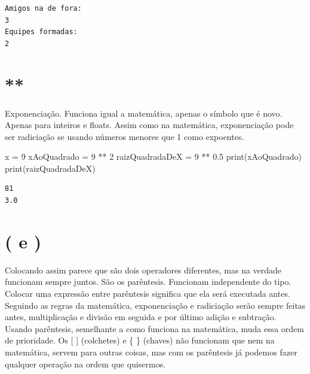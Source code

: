 \documentclass[
  letterpaper,
  DIV=11,
  numbers=noendperiod]{scrreprt}
\newenvironment{Shaded}{\begin{snugshade}}{\end{snugshade}}
\newcommand{\BuiltInTok}[1]{\textcolor[rgb]{0.00,0.23,0.31}{#1}}
\newcommand{\DecValTok}[1]{\textcolor[rgb]{0.68,0.00,0.00}{#1}}
\newcommand{\FloatTok}[1]{\textcolor[rgb]{0.68,0.00,0.00}{#1}}
\newcommand{\NormalTok}[1]{\textcolor[rgb]{0.00,0.23,0.31}{#1}}
\newcommand{\OperatorTok}[1]{\textcolor[rgb]{0.37,0.37,0.37}{#1}}
\begin{document}
\begin{tcolorbox}[enhanced jigsaw, breakable, leftrule=.75mm, left=2mm, opacityback=0, bottomrule=.15mm, toprule=.15mm, rightrule=.15mm, arc=.35mm, colback=white]

\begin{verbatim}
Amigos na de fora:
3
Equipes formadas:
2
\end{verbatim}

\end{tcolorbox}

\hypertarget{section}{%
\section{**}\label{section}}

Exponenciação. Funciona igual a matemática, apenas o símbolo que é novo.
Apenas para inteiros e floats. Assim como na matemática, exponenciação
pode ser radiciação se usando números menores que 1 como expoentes.

\begin{Shaded}
\begin{Highlighting}[]
\NormalTok{x }\OperatorTok{=} \DecValTok{9}
\NormalTok{xAoQuadrado }\OperatorTok{=} \DecValTok{9} \OperatorTok{**} \DecValTok{2}
\NormalTok{raizQuadradaDeX }\OperatorTok{=} \DecValTok{9} \OperatorTok{**} \FloatTok{0.5}
\BuiltInTok{print}\NormalTok{(xAoQuadrado)}
\BuiltInTok{print}\NormalTok{(raizQuadradaDeX)}
\end{Highlighting}
\end{Shaded}

\begin{tcolorbox}[enhanced jigsaw, breakable, leftrule=.75mm, left=2mm, opacityback=0, bottomrule=.15mm, toprule=.15mm, rightrule=.15mm, arc=.35mm, colback=white]

\begin{verbatim}
81
3.0
\end{verbatim}

\end{tcolorbox}

\hypertarget{e-2}{%
\section{( e )}\label{e-2}}

Colocando assim parece que são dois operadores diferentes, mas na
verdade funcionam sempre juntos. São os parêntesis. Funcionam
independente do tipo. Colocar uma expressão entre parêntesis significa
que ela será executada antes. Seguindo as regras da matemática,
exponenciação e radiciação serão sempre feitas antes, multiplicação e
divisão em seguida e por último adição e subtração. Usando parêntesis,
semelhante a como funciona na matemática, muda essa ordem de prioridade.
Os {[} {]} (colchetes) e \{ \} (chaves) não funcionam que nem na
matemática, servem para outras coisas, mas com os parêntesis já podemos
fazer qualquer operação na ordem que quisermos.
\end{document}
